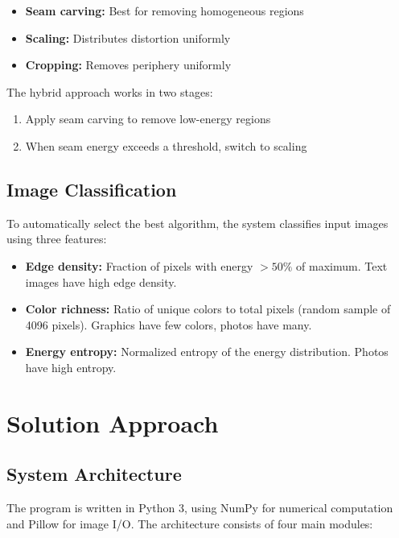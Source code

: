 \documentclass[12pt,a4paper]{article}
\begin{document}
\begin{itemize}
    \item \textbf{Seam carving:} Best for removing homogeneous regions
    \item \textbf{Scaling:} Distributes distortion uniformly
    \item \textbf{Cropping:} Removes periphery uniformly
\end{itemize}

The hybrid approach works in two stages:

\begin{enumerate}
    \item Apply seam carving to remove low-energy regions
    \item When seam energy exceeds a threshold, switch to scaling
\end{enumerate}

\subsection{Image Classification}

To automatically select the best algorithm, the system classifies input images using three features:

\begin{itemize}
    \item \textbf{Edge density:} Fraction of pixels with energy $> 50\%$ of maximum. Text images have high edge density.
    \item \textbf{Color richness:} Ratio of unique colors to total pixels (random sample of 4096 pixels). Graphics have few colors, photos have many.
    \item \textbf{Energy entropy:} Normalized entropy of the energy distribution. Photos have high entropy.
\end{itemize}

\newpage
\section{Solution Approach}

\subsection{System Architecture}

The program is written in Python 3, using NumPy for numerical computation and Pillow for image I/O. The architecture consists of four main modules:
\end{document}

